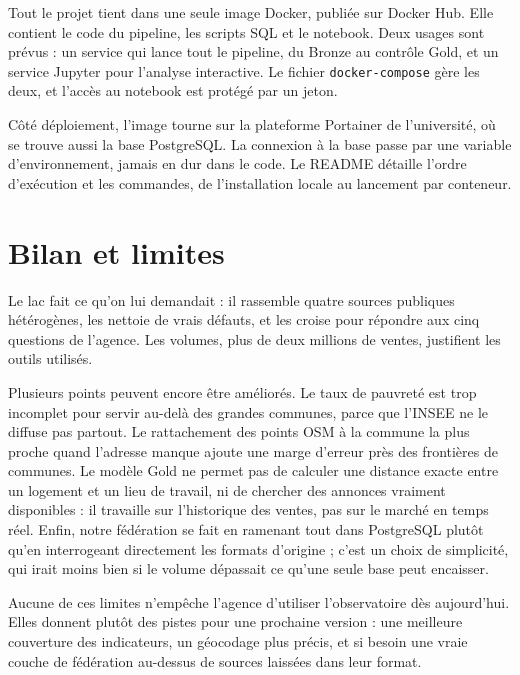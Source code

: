 \documentclass[11pt,a4paper]{article}
\begin{document}
Tout le projet tient dans une seule image Docker, publiée sur Docker Hub. Elle contient le code du pipeline, les scripts SQL et le notebook. Deux usages sont prévus : un service qui lance tout le pipeline, du Bronze au contrôle Gold, et un service Jupyter pour l'analyse interactive. Le fichier \texttt{docker-compose} gère les deux, et l'accès au notebook est protégé par un jeton.

Côté déploiement, l'image tourne sur la plateforme Portainer de l'université, où se trouve aussi la base PostgreSQL. La connexion à la base passe par une variable d'environnement, jamais en dur dans le code. Le README détaille l'ordre d'exécution et les commandes, de l'installation locale au lancement par conteneur.

\section{Bilan et limites}

Le lac fait ce qu'on lui demandait : il rassemble quatre sources publiques hétérogènes, les nettoie de vrais défauts, et les croise pour répondre aux cinq questions de l'agence. Les volumes, plus de deux millions de ventes, justifient les outils utilisés.

Plusieurs points peuvent encore être améliorés. Le taux de pauvreté est trop incomplet pour servir au-delà des grandes communes, parce que l'INSEE ne le diffuse pas partout. Le rattachement des points OSM à la commune la plus proche quand l'adresse manque ajoute une marge d'erreur près des frontières de communes. Le modèle Gold ne permet pas de calculer une distance exacte entre un logement et un lieu de travail, ni de chercher des annonces vraiment disponibles : il travaille sur l'historique des ventes, pas sur le marché en temps réel. Enfin, notre fédération se fait en ramenant tout dans PostgreSQL plutôt qu'en interrogeant directement les formats d'origine ; c'est un choix de simplicité, qui irait moins bien si le volume dépassait ce qu'une seule base peut encaisser.

Aucune de ces limites n'empêche l'agence d'utiliser l'observatoire dès aujourd'hui. Elles donnent plutôt des pistes pour une prochaine version : une meilleure couverture des indicateurs, un géocodage plus précis, et si besoin une vraie couche de fédération au-dessus de sources laissées dans leur format.
\end{document}
